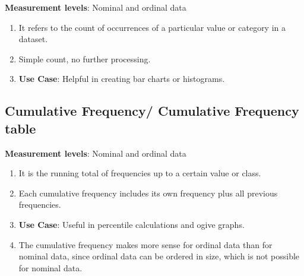 \textbf{Measurement levels}: Nominal and ordinal data

\vspace{0.3cm}

\begin{enumerate}
    \item It refers to the count of occurrences of a particular value or category in a dataset. \cite{common/online/chatgpt}

    \item Simple count, no further processing. \cite{common/online/chatgpt}

    \item \textbf{Use Case}: Helpful in creating bar charts or histograms. \cite{common/online/chatgpt}
\end{enumerate}



\subsection{Cumulative Frequency/ Cumulative Frequency table \cite{statistics/book/Statistics-for-Data-Scientists/Maurits-Kaptein}}\label{Data/Describing Data/Cumulative Frequency or Cumulative Frequency table}

\textbf{Measurement levels}: Nominal and ordinal data

\vspace{0.3cm}
\begin{enumerate}
    \item It is the running total of frequencies up to a certain value or class. \cite{common/online/chatgpt}

    \item Each cumulative frequency includes its own frequency plus all previous frequencies. \cite{common/online/chatgpt}

    \item \textbf{Use Case}: Useful in percentile calculations and ogive graphs. \cite{common/online/chatgpt}

    \item The cumulative frequency makes more sense for ordinal data than for nominal data, since ordinal data can be ordered in size, which is not possible for nominal data. \cite{statistics/book/Statistics-for-Data-Scientists/Maurits-Kaptein}
\end{enumerate}


